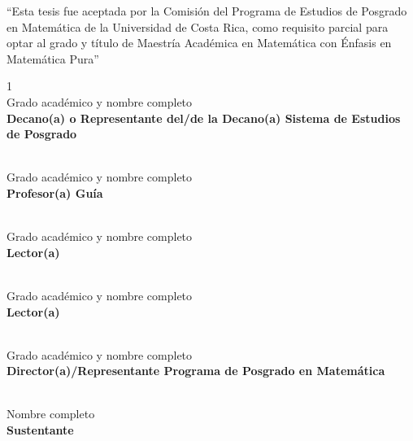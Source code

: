 \documentclass[12pt,oneside]{book}
\theoremstyle{definition}
\begin{document}

\begin{center}
``Esta tesis fue aceptada por la Comisión del Programa de Estudios de Posgrado en Matemática de la Universidad de Costa Rica, como requisito parcial para optar al grado y título de Maestría Académica en Matemática con Énfasis en Matemática Pura''



\begin{spacing}{1}
\vspace{1.5cm}
\underline{\hspace{10cm}} \\
Grado académico y nombre completo \\
\textbf{Decano(a) o Representante del/de la Decano(a)
Sistema de Estudios de Posgrado}


\vspace{1.5cm}
\underline{\hspace{10cm}} \\
Grado académico y nombre completo \\
\textbf{Profesor(a) Guía}



\vspace{1.5cm}
\underline{\hspace{10cm}} \\
Grado académico y nombre completo \\
\textbf{Lector(a)}


\vspace{1.5cm}
\underline{\hspace{10cm}} \\
Grado académico y nombre completo \\
\textbf{Lector(a)}


\vspace{1.5cm}
\underline{\hspace{10cm}} \\
Grado académico y nombre completo \\
\textbf{Director(a)/Representante Programa de Posgrado en Matemática}


\vspace{1.5cm}
\underline{\hspace{10cm}} \\
Nombre completo \\
\textbf{Sustentante}
\end{spacing}


\end{center}
\end{document}
